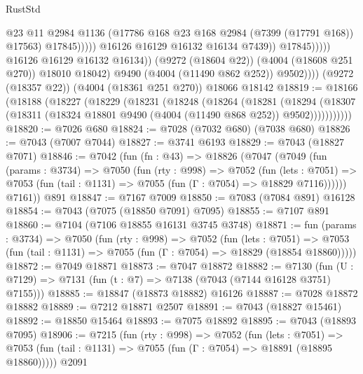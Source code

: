 \begin{lexlean}{RustStd}
\begin{coremodule}
                                          @23
                                          @11
                                          @2984
                                          @1136
                                          (@17786 @168 @23 @168 @2984 (@7399 (@17791 @168)) @17563)
                                          @17845)))))
                                @16126
                                @16129
                                @16132
                                @16134
                                @7439))
                            @17845)))))
                  @16126
                  @16129
                  @16132
                  @16134))
              (@9272 (@18604 @22))
              (@4004 (@18608 @251 @270))
              @18010
              @18042)
            @9490
            (@4004 (@11490 @862 @252))
            @9502))))
    (@9272 (@18357 @22))
    (@4004 (@18361 @251 @270))
    @18066
    @18142
@18819 := @18166
    (@18188
      (@18227
        (@18229
          (@18231
            (@18248
              (@18264
                (@18281
                  (@18294
                    (@18307 (@18311 (@18324 @18801 @9490 (@4004 (@11490 @868 @252)) @9502)))))))))))
@18820 := @7026 @680
@18824 := @7028 (@7032 @680) (@7038 @680)
@18826 := @7043 (@7007 @7044)
@18827 := @3741 @6193
@18829 := @7043 (@18827 @7071)
@18846 := @7042
    (fun (fn : @43) =>
    @18826
      (@7047
        (@7049
          (fun (params : @3734) =>
          @7050
            (fun (rty : @998) =>
            @7052
              (fun (lets : @7051) =>
              @7053 (fun (tail : @1131) => @7055 (fun (Γ : @7054) => @18829 @7116))))))
        @7161))
    @891
@18847 := @7167 @7009
@18850 := @7083 (@7084 @891) @16128
@18854 := @7043 (@7075 (@18850 @7091) @7095)
@18855 := @7107 @891
@18860 := @7104 (@7106 @18855 @16131 @3745 @3748)
@18871 := fun (params : @3734) =>
  @7050
    (fun (rty : @998) =>
    @7052
      (fun (lets : @7051) =>
      @7053 (fun (tail : @1131) => @7055 (fun (Γ : @7054) => @18829 (@18854 @18860)))))
@18872 := @7049 @18871
@18873 := @7047 @18872
@18882 := @7130
    (fun (U : @7129) => @7131 (fun (t : @7) => @7138 (@7043 (@7144 @16128 @3751) @7155)))
@18885 := @18847 (@18873 @18882) @16126
@18887 := @7028 @18872 @18882
@18889 := @7212 @18871 @2507
@18891 := @7043 (@18827 @15461)
@18892 := @18850 @15464
@18893 := @7075 @18892
@18895 := @7043 (@18893 @7095)
@18906 := @7215
    (fun (rty : @998) =>
    @7052
      (fun (lets : @7051) =>
      @7053 (fun (tail : @1131) => @7055 (fun (Γ : @7054) => @18891 (@18895 @18860)))))
    @2091

\end{coremodule}
\end{lexlean}
